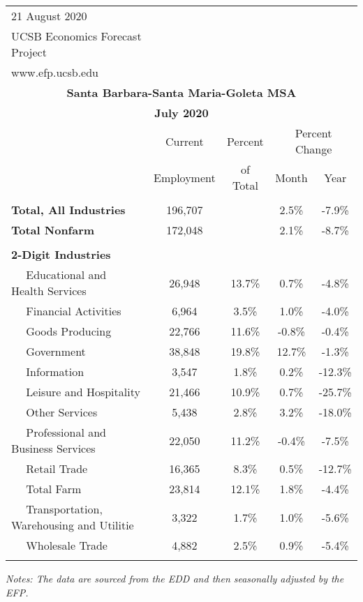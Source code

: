 \documentclass[12pt]{article}
\begin{document}
\begin{landscape}
\begin{table}
\begin{tabular}{|l|c|c|c|c|}
\multicolumn{1}{l}{\small 21 August 2020} & \multicolumn{4}{c}{} \\
\multicolumn{1}{l}{\small UCSB Economics Forecast Project} & \multicolumn{4}{c}{} \\
\multicolumn{1}{l}{\small www.efp.ucsb.edu} & \multicolumn{4}{c}{} \\
\multicolumn{5}{c}{\large \textbf{Santa Barbara-Santa Maria-Goleta MSA}} \\
\multicolumn{5}{c}{\large \textbf{July 2020}} \
\multicolumn{5}{l}{\small Data Seasonally Adjusted} \\ \hline \hline
& Current & Percent & \multicolumn{2}{c}{Percent Change} \vline \\
& Employment & of Total & Month & Year \\ \hline
&&&& \\
\textbf{Total, All Industries} & 196,707 && 2.5\% & -7.9\% \\
\textbf{Total Nonfarm} & 172,048 && 2.1\% & -8.7\% \\
&&&& \\
\textbf{2-Digit Industries} &&&& \\
$\quad$ Educational and Health Services & 26,948 & 13.7\% & 0.7\% & -4.8\% \\
$\quad$ Financial Activities & 6,964 & 3.5\% & 1.0\% & -4.0\% \\
$\quad$ Goods Producing & 22,766 & 11.6\% & -0.8\% & -0.4\% \\
$\quad$ Government & 38,848 & 19.8\% & 12.7\% & -1.3\% \\
$\quad$ Information & 3,547 & 1.8\% & 0.2\% & -12.3\% \\
$\quad$ Leisure and Hospitality & 21,466 & 10.9\% & 0.7\% & -25.7\% \\
$\quad$ Other Services & 5,438 & 2.8\% & 3.2\% & -18.0\% \\
$\quad$ Professional and Business Services & 22,050 & 11.2\% & -0.4\% & -7.5\% \\
$\quad$ Retail Trade & 16,365 & 8.3\% & 0.5\% & -12.7\% \\
$\quad$ Total Farm & 23,814 & 12.1\% & 1.8\% & -4.4\% \\
$\quad$ Transportation, Warehousing and Utilitie & 3,322 & 1.7\% & 1.0\% & -5.6\% \\
$\quad$ Wholesale Trade & 4,882 & 2.5\% & 0.9\% & -5.4\% \\
&&&& \\ \hline \hline
\end{tabular}
\par
\vspace{.5em}
\footnotesize
\textit{Notes: The data are sourced from the EDD and then seasonally adjusted by the EFP.}
\end{table}
\end{landscape}
\end{document}
